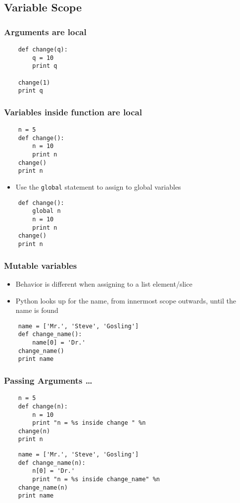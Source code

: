 \subsection*{Variable Scope}

\begin{frame}[fragile]
  \frametitle{Arguments are local}
  \begin{lstlisting}
    def change(q):
        q = 10
        print q

    change(1)
    print q
  \end{lstlisting}
\end{frame}

\begin{frame}[fragile]
  \frametitle{Variables inside function are local}
  \begin{lstlisting}
    n = 5
    def change():
        n = 10
        print n
    change()
    print n
  \end{lstlisting}
  \begin{itemize}
  \item Use the \texttt{global} statement to assign to global variables
  \end{itemize}
  \begin{lstlisting}
    def change():
        global n
        n = 10
        print n
    change()
    print n
  \end{lstlisting}
\end{frame}

\begin{frame}[fragile]
  \frametitle{Mutable variables}
  \begin{itemize}
  \item Behavior is different when assigning to a list element/slice
  \item Python looks up for the name, from innermost scope outwards,
    until the name is found
  \end{itemize}
  \begin{lstlisting}
    name = ['Mr.', 'Steve', 'Gosling']
    def change_name():
        name[0] = 'Dr.'
    change_name()
    print name
  \end{lstlisting}
\end{frame}

\begin{frame}[fragile]
  \frametitle{Passing Arguments \ldots}
  \begin{lstlisting}
    n = 5
    def change(n):
        n = 10
        print "n = %s inside change " %n
    change(n)
    print n
  \end{lstlisting}
  
  \begin{lstlisting}
    name = ['Mr.', 'Steve', 'Gosling']
    def change_name(n):
        n[0] = 'Dr.'
        print "n = %s inside change_name" %n
    change_name(n)
    print name
  \end{lstlisting}
\end{frame}
